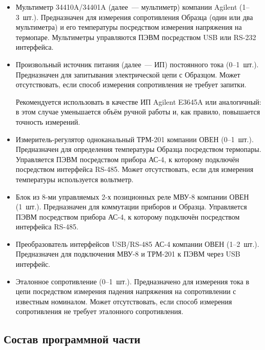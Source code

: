 \documentclass[12pt, a4paper, twocolumn]{report}
\begin{document}
\begin{itemize}

\item Мультиметр 34410A/34401A (далее~--- мультиметр) компании Agilent (1--3~шт.). Предназначен для измерения сопротивления Образца (один или два мультиметра) и его температуры посредством измерения напряжения на термопаре. Мультиметры управляются ПЭВМ посредством USB или RS-232 интерфейса.

\item Произвольный источник питания (далее~--- ИП) постоянного тока (0--1~шт.). Предназначен для запитывания электрической цепи с Образцом. Может отсутствовать, если способ измерения сопротивления не требует запитки.

Рекомендуется использовать в качестве ИП Agilent E3645A или аналогичный: в этом случае уменьшается объём ручной работы и, как правило, повышается точность измерений.

\item Измеритель-регулятор одноканальный ТРМ-201 компании ОВЕН (0--1~шт.). Предназначен для определения температуры Образца посредством термопары. Управляется ПЭВМ посредством прибора АС-4, к которому подключён посредством интерфейса RS-485. Может отсутствовать, если для измерения температуры используется вольтметр.

\item Блок из 8-ми управляемых 2-х позиционных реле МВУ-8 компании ОВЕН (1~шт.). Предназначен для коммутации приборов и Образца. Управляется ПЭВМ посредством прибора АС-4, к которому подключён посредством интерфейса RS-485.

\item Преобразователь интерфейсов USB/RS-485 АС-4 компании ОВЕН (1--2~шт.). Предназначен для подключения МВУ-8 и ТРМ-201 к ПЭВМ через USB интерфейс.

\item Эталонное сопротивление (0--1~шт.). Предназначено для измерения тока в цепи посредством измерения падения напряжения на сопротивлении с известным номиналом. Может отсутствовать, если способ измерения сопротивления не требует эталонного сопротивления.

\end{itemize}

\subsection{Состав программной части}
\label{sec_software}
\end{document}
